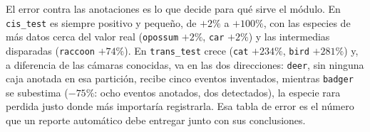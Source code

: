 

El error contra las anotaciones es lo que decide para qué sirve el módulo. En
\texttt{cis\_test} es siempre positivo y pequeño, de $+2\%$ a $+100\%$, con las
especies de más datos cerca del valor real (\texttt{opossum} $+2\%$, \texttt{car}
$+2\%$) y las intermedias disparadas (\texttt{raccoon} $+74\%$). En
\texttt{trans\_test} crece (\texttt{cat} $+234\%$, \texttt{bird} $+281\%$) y, a
diferencia de las cámaras conocidas, va en las dos direcciones: \texttt{deer},
sin ninguna caja anotada en esa partición, recibe cinco eventos inventados,
mientras \texttt{badger} se subestima ($-75\%$: ocho eventos anotados, dos
detectados), la especie rara perdida justo donde más importaría registrarla. Esa
tabla de error es el número que un reporte automático debe entregar junto con sus
conclusiones.

